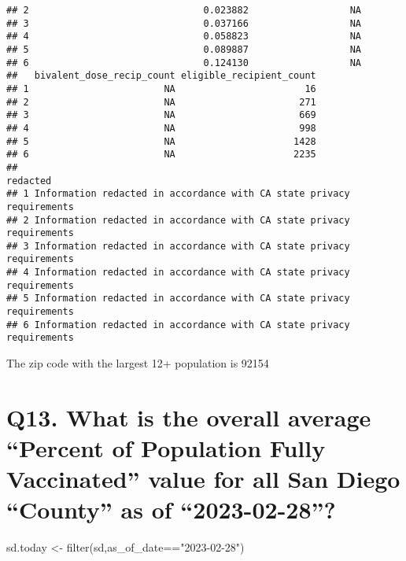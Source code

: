 \documentclass[
]{article}
\newenvironment{Shaded}{\begin{snugshade}}{\end{snugshade}}
\newcommand{\AttributeTok}[1]{\textcolor[rgb]{0.77,0.63,0.00}{#1}}
\newcommand{\FunctionTok}[1]{\textcolor[rgb]{0.00,0.00,0.00}{#1}}
\newcommand{\NormalTok}[1]{#1}
\newcommand{\OtherTok}[1]{\textcolor[rgb]{0.56,0.35,0.01}{#1}}
\newcommand{\SpecialCharTok}[1]{\textcolor[rgb]{0.00,0.00,0.00}{#1}}
\newcommand{\StringTok}[1]{\textcolor[rgb]{0.31,0.60,0.02}{#1}}
\begin{document}
\begin{verbatim}
## 2                               0.023882                  NA
## 3                               0.037166                  NA
## 4                               0.058823                  NA
## 5                               0.089887                  NA
## 6                               0.124130                  NA
##   bivalent_dose_recip_count eligible_recipient_count
## 1                        NA                       16
## 2                        NA                      271
## 3                        NA                      669
## 4                        NA                      998
## 5                        NA                     1428
## 6                        NA                     2235
##                                                                redacted
## 1 Information redacted in accordance with CA state privacy requirements
## 2 Information redacted in accordance with CA state privacy requirements
## 3 Information redacted in accordance with CA state privacy requirements
## 4 Information redacted in accordance with CA state privacy requirements
## 5 Information redacted in accordance with CA state privacy requirements
## 6 Information redacted in accordance with CA state privacy requirements
\end{verbatim}

The zip code with the largest 12+ population is 92154

\hypertarget{q13.-what-is-the-overall-average-percent-of-population-fully-vaccinated-value-for-all-san-diego-county-as-of-2023-02-28}{%
\section{Q13. What is the overall average ``Percent of Population Fully
Vaccinated'' value for all San Diego ``County'' as of
``2023-02-28''?}\label{q13.-what-is-the-overall-average-percent-of-population-fully-vaccinated-value-for-all-san-diego-county-as-of-2023-02-28}}

\begin{Shaded}
\begin{Highlighting}[]
\NormalTok{sd.today }\OtherTok{\textless{}{-}} \FunctionTok{filter}\NormalTok{(sd,as\_of\_date}\SpecialCharTok{==}\StringTok{"2023{-}02{-}28"}\NormalTok{)}
\end{Highlighting}
\end{Shaded}

\begin{Shaded}
\end{Shaded}
\end{document}
